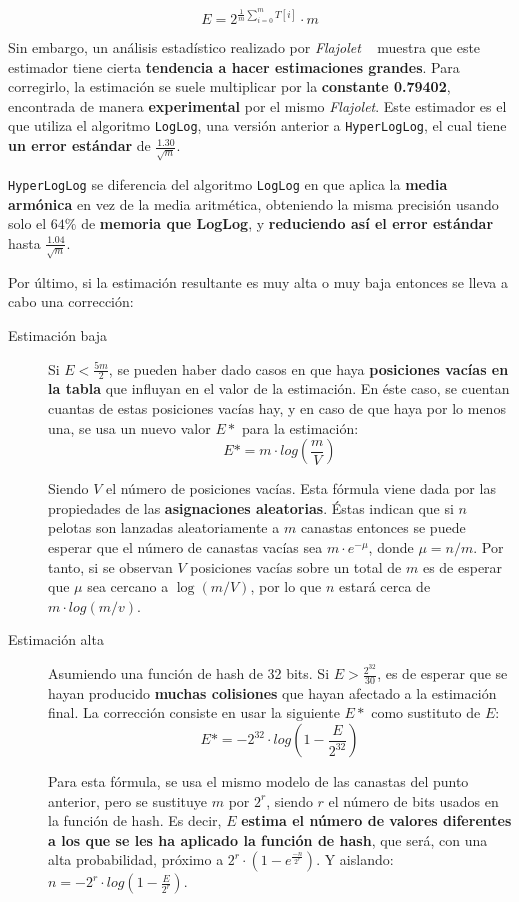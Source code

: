 $$ E = 2 ^ { \frac{1}{m} \sum\limits_{i=0}^{m}\! T[i] } \cdot m $$

Sin embargo, un análisis estadístico realizado por \emph{Flajolet} ~\cite{hll:HyperLogLog} muestra que este estimador
tiene cierta \textbf{tendencia a hacer estimaciones grandes}. Para corregirlo, la estimación se suele multiplicar por la
\textbf{constante 0.79402}, encontrada de manera \textbf{experimental} por el mismo \emph{Flajolet}.
Este estimador es el que utiliza el algoritmo \texttt{LogLog}, una versión anterior a \texttt{HyperLogLog}, el cual tiene
\textbf{un error estándar} de  $\frac{1.30}{\sqrt{m}}$.

\texttt{HyperLogLog} se diferencia del algoritmo \texttt{LogLog} en que aplica la \textbf{media armónica} en vez de la
media aritmética, obteniendo la misma precisión usando solo el $64\%$ de \textbf{memoria que LogLog}, y \textbf{reduciendo así el error estándar} hasta $\frac{1.04}{\sqrt{m}}$.

Por último, si la estimación resultante es muy alta o muy baja entonces se lleva a cabo una corrección:

\begin{description}
\item[Estimación baja] Si $E < \frac{5m}{2}$, se pueden haber dado casos en que haya \textbf{posiciones vacías en la tabla} que
influyan en el valor de la estimación. En éste caso, se cuentan cuantas de estas posiciones vacías
hay, y en caso de que haya por lo menos una, se usa un nuevo valor $E*$ para la estimación: 
$$E* = m \cdot log\left(\frac{m}{V}\right)$$

Siendo $V$ el número de posiciones vacías. Esta fórmula viene dada por las propiedades de las
\textbf{asignaciones aleatorias}. Éstas indican que si $n$ pelotas son lanzadas aleatoriamente a $m$ canastas entonces
se puede esperar que el número de canastas vacías sea $m \cdot e^{-\mu}$, donde $\mu = n / m$. Por tanto, si se observan
$V$ posiciones vacías sobre un total de $m$ es de esperar que $\mu$ sea cercano a $\log(m/V)$, por lo que $n$ estará
cerca de $m \cdot log(m/v)$.

\item[Estimación alta] Asumiendo una función de hash de 32 bits. Si $E > \frac{2^{32}}{30}$, es de esperar que se hayan
producido \textbf{muchas colisiones} que hayan afectado a la estimación final. La corrección consiste en usar la siguiente $E*$
como sustituto de $E$:
$$E* = -2^{32} \cdot log\left(1 - \frac{E}{2^{32}}\right)$$

Para esta fórmula, se usa el mismo modelo de las canastas del punto anterior, pero se sustituye $m$
por $2^r$, siendo $r$ el número de bits usados en la función de hash. Es decir, $E$ \textbf{estima el número de valores diferentes
a los que se les ha aplicado la función de hash}, que será, con una alta probabilidad, próximo a $2^r \cdot (1 - e^{\frac{-n}{2^r}})$.
Y aislando: $n=-2^r \cdot log\left(1 - \frac{E}{2^r}\right)$.
\end{description}

